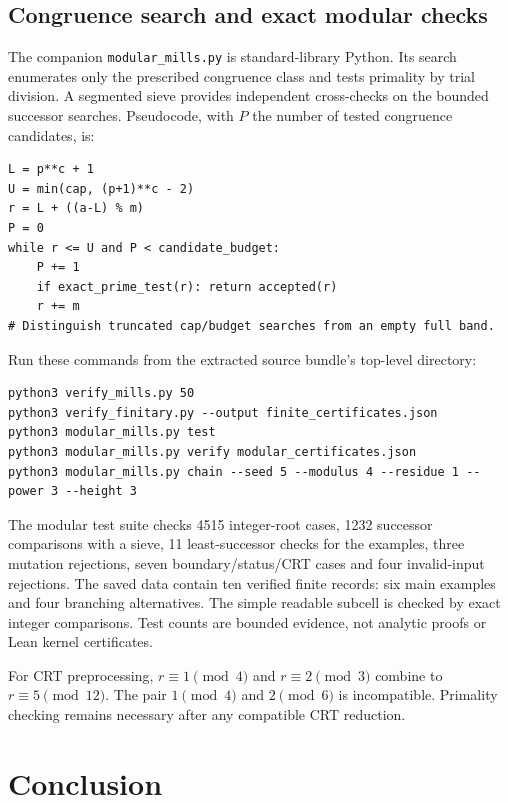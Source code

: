 \documentclass[11pt,reqno]{amsart}
\theoremstyle{blueplain}
\numberwithin{equation}{section}
\begin{document}
\subsection{Congruence search and exact modular checks}\label{sec:mod-scripts}
The companion \texttt{modular\_mills.py} is standard-library Python. Its
search enumerates only the prescribed congruence class and tests primality
by trial division. A segmented sieve provides independent cross-checks
on the bounded successor searches. Pseudocode, with \(P\) the number
of tested congruence candidates, is:
\begin{lstlisting}[style=python,basicstyle=\ttfamily\scriptsize,numberstyle=\scriptsize]
L = p**c + 1
U = min(cap, (p+1)**c - 2)
r = L + ((a-L) % m)
P = 0
while r <= U and P < candidate_budget:
    P += 1
    if exact_prime_test(r): return accepted(r)
    r += m
# Distinguish truncated cap/budget searches from an empty full band.
\end{lstlisting}
Run these commands from the extracted source bundle's top-level directory:
\begin{lstlisting}[style=python,basicstyle=\ttfamily\scriptsize,numberstyle=\scriptsize]
python3 verify_mills.py 50
python3 verify_finitary.py --output finite_certificates.json
python3 modular_mills.py test
python3 modular_mills.py verify modular_certificates.json
python3 modular_mills.py chain --seed 5 --modulus 4 --residue 1 --power 3 --height 3
\end{lstlisting}
The modular test suite checks 4515 integer-root cases, 1232 successor
comparisons with a sieve, 11 least-successor checks for the examples,
three mutation rejections, seven boundary/status/CRT cases and four
invalid-input rejections. The saved data contain ten verified finite
records: six main examples and four branching alternatives. The simple
readable subcell is checked by exact integer comparisons. Test counts
are bounded evidence, not analytic proofs or Lean kernel certificates.

For CRT preprocessing, \(r\equiv1\pmod4\) and \(r\equiv2\pmod3\)
combine to \(r\equiv5\pmod{12}\). The pair \(1\pmod4\) and
\(2\pmod6\) is incompatible. Primality checking remains necessary
after any compatible CRT reduction.
\section{Conclusion}\label{sec:conclusion}
\end{document}
